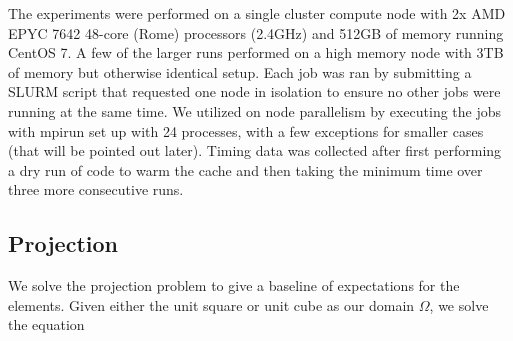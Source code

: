 \documentclass[format=acmsmall,screen,timestamp=false,a4paper]{acmart}
\newcommand\josh[1]{\textbf{\textcolor[rgb]{0,.5,1}{[Josh: #1]}}}
\begin{document}
The experiments were performed on a single cluster compute node with 2x AMD EPYC 7642 48-core (Rome) processors (2.4GHz) and 512GB of memory running CentOS 7.  A few of the larger runs performed on a high memory node with 3TB of memory but otherwise identical setup.  Each job was ran by submitting a SLURM script that requested one node in isolation to ensure no other jobs were running at the same time.  We utilized on node parallelism by executing the jobs with mpirun set up with 24 processes, with a few exceptions for smaller cases (that will be pointed out later).  Timing data was collected after first performing a dry run of code to warm the cache and then taking the minimum time over three more consecutive runs.  









  \subsection{Projection}
  
  We solve the projection problem to give a baseline of expectations for the elements. Given either the unit square or unit cube as our domain $\Omega$, we solve the equation 
  
\end{document}
